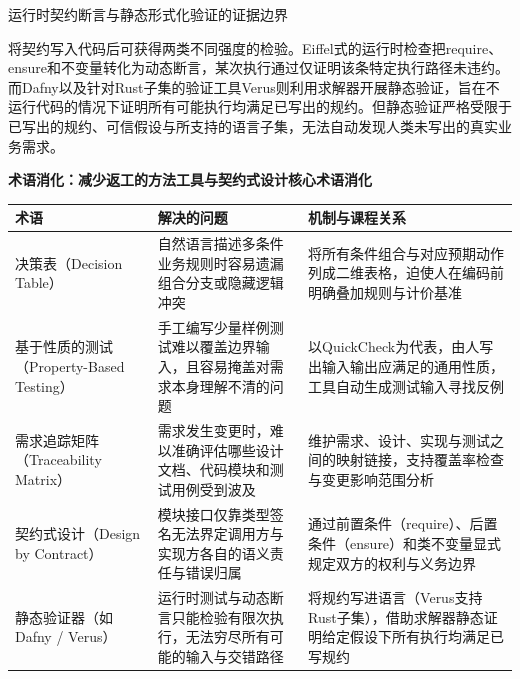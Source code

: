 \documentclass[UTF8,a4paper,11pt,fontset=fandol]{ctexart}
\begin{document}
\begin{knowledgebox}{运行时契约断言与静态形式化验证的证据边界}

将契约写入代码后可获得两类不同强度的检验。Eiffel式的运行时检查把require、ensure和不变量转化为动态断言，某次执行通过仅证明该条特定执行路径未违约。而Dafny以及针对Rust子集的验证工具Verus则利用求解器开展静态验证，旨在不运行代码的情况下证明所有可能执行均满足已写出的规约。但静态验证严格受限于已写出的规约、可信假设与所支持的语言子集，无法自动发现人类未写出的真实业务需求。

\end{knowledgebox}

\par{}\textbf{术语消化：减少返工的方法工具与契约式设计核心术语消化}

\begin{center}\small\begin{tabularx}{\linewidth}{YYY}

\toprule

术语 & 解决的问题 & 机制与课程关系\\\midrule

决策表（Decision Table） & 自然语言描述多条件业务规则时容易遗漏组合分支或隐藏逻辑冲突 & 将所有条件组合与对应预期动作列成二维表格，迫使人在编码前明确叠加规则与计价基准\\[3pt]

基于性质的测试（Property-Based Testing） & 手工编写少量样例测试难以覆盖边界输入，且容易掩盖对需求本身理解不清的问题 & 以QuickCheck为代表，由人写出输入输出应满足的通用性质，工具自动生成测试输入寻找反例\\[3pt]

需求追踪矩阵（Traceability Matrix） & 需求发生变更时，难以准确评估哪些设计文档、代码模块和测试用例受到波及 & 维护需求、设计、实现与测试之间的映射链接，支持覆盖率检查与变更影响范围分析\\[3pt]

契约式设计（Design by Contract） & 模块接口仅靠类型签名无法界定调用方与实现方各自的语义责任与错误归属 & 通过前置条件（require）、后置条件（ensure）和类不变量显式规定双方的权利与义务边界\\[3pt]

静态验证器（如Dafny / Verus） & 运行时测试与动态断言只能检验有限次执行，无法穷尽所有可能的输入与交错路径 & 将规约写进语言（Verus支持Rust子集），借助求解器静态证明给定假设下所有执行均满足已写规约\\[3pt]

\bottomrule\end{tabularx}\end{center}
\end{document}
